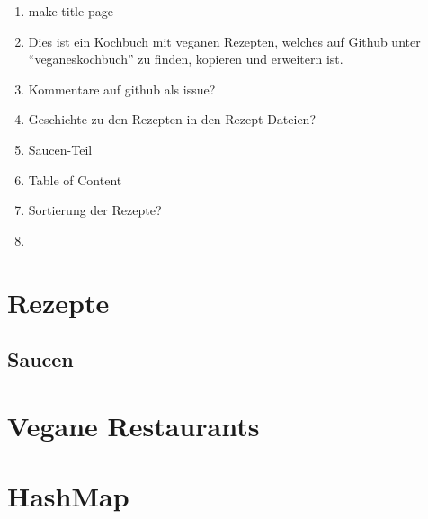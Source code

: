\documentclass[12pt,a4paper]{article}
\begin{document}
\begin{enumerate}
	\item make title page
	\item Dies ist ein Kochbuch mit veganen Rezepten, welches auf Github unter \enquote{veganeskochbuch} zu finden, kopieren und erweitern ist.\\
	\item Kommentare auf github als issue?
	\item Geschichte zu den Rezepten in den Rezept-Dateien?
	\item Saucen-Teil
	\item Table of Content
	\item Sortierung der Rezepte?
	\item 
\end{enumerate}
\clearpage
\section{Rezepte}
	
	
	
	
	
\subsection[Saucen]{Saucen}
    
    
	
\section{Vegane Restaurants}
	
	
\section{HashMap}
	
\end{document}
